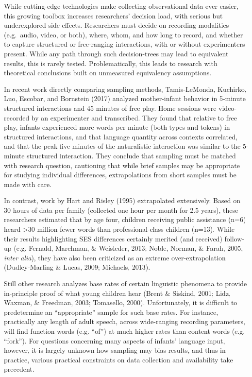 \documentclass[man]{apa6}
\theoremstyle{definition}
\theoremstyle{definition}
\theoremstyle{definition}
\theoremstyle{remark}
\begin{document}
While cutting-edge technologies make collecting observational data ever
easier, this growing toolbox increases researchers' decision load, with
serious but underexplored side-effects. Researchers must decide on
recording modalities (e.g.~audio, video, or both), where, whom, and how
long to record, and whether to capture structured or free-ranging
interactions, with or without experimenters present. While any path
through such decision-trees may lead to equivalent results, this is
rarely tested. Problematically, this leads to research with theoretical
conclusions built on unmeasured equivalency assumptions.

In recent work directly comparing sampling methods, Tamis-LeMonda,
Kuchirko, Luo, Escobar, and Bornstein (2017) analyzed mother-infant
behavior in 5-minute structured interactions and 45 minutes of free
play. Home sessions were video-recorded by an experimenter and
transcribed. They found that relative to free play, infants experienced
more words per minute (both types and tokens) in structured
interactions, and that language quantity across contexts correlated, and
that the peak five minutes of the naturalistic interaction was similar
to the 5-minute structured interaction. They conclude that sampling must
be matched with research question, cautioning that while brief samples
may be appropriate for studying individual differences, extrapolations
from short samples must be made with care.

In contrast, work by Hart and Risley (1995) extrapolated extensively.
Based on 30 hours of data per family (collected one hour per month for
2.5 years), these researchers estimated that by age four, children
receiving public assistance (n=6) heard \textgreater{}30 million fewer
words than professional-class children (n=13). While their results
highlighting SES differences certainly merited (and received) follow-up
(e.g. Fernald, Marchman, \& Weisleder, 2013; Noble, Norman, \& Farah,
2005, \emph{inter alia}), they have also been criticized as an extreme
over-extrapolation (Dudley-Marling \& Lucas, 2009; Michaels, 2013).

Still other research analyzes base rates of certain linguistic phenomena
to provide in-principle proof of what young children hear (Brent \&
Siskind, 2001; Lidz, Waxman, \& Freedman, 2003; Tomasello, 2000).
Unfortunately, it is difficult to predetermine an \enquote{appropriate}
sample for such base rates. For instance, practically any length of
adult speech, across wide-ranging recording parameters, will find
function words (e.g. \enquote{of}) at much higher rates than content
words (e.g. \enquote{fork}). For questions concerning many aspects of
infants' language input, however, it is largely unknown how sampling may
bias results, and thus in practice, various practical constraints on
data collection and availability take precedent.
\end{document}
